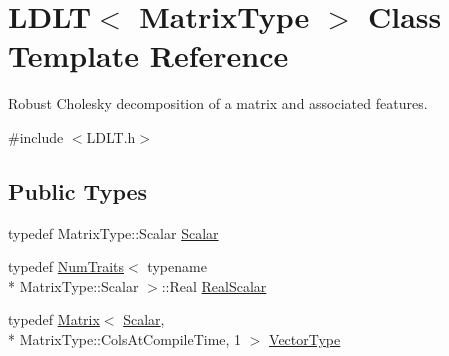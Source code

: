 \hypertarget{class_l_d_l_t}{\section{L\-D\-L\-T$<$ Matrix\-Type $>$ Class Template Reference}
\label{class_l_d_l_t}
}


Robust Cholesky decomposition of a matrix and associated features.  




{\ttfamily \#include $<$L\-D\-L\-T.\-h$>$}

\subsection*{Public Types}
\begin{DoxyCompactItemize}
\item 
typedef Matrix\-Type\-::\-Scalar \hyperlink{class_l_d_l_t_ae55ec2b52123617df554245d2abdd822}{Scalar}
\item 
typedef \hyperlink{struct_num_traits}{Num\-Traits}$<$ typename \\*
Matrix\-Type\-::\-Scalar $>$\-::Real \hyperlink{class_l_d_l_t_a5ef1952281688f7ff35aa4ec2ebc3bd8}{Real\-Scalar}
\item 
typedef \hyperlink{class_matrix}{Matrix}$<$ \hyperlink{class_l_d_l_t_ae55ec2b52123617df554245d2abdd822}{Scalar}, \\*
Matrix\-Type\-::\-Cols\-At\-Compile\-Time, 1 $>$ \hyperlink{class_l_d_l_t_a2a0f1aae9da955022bc638c215062cce}{Vector\-Type}
\end{DoxyCompactItemize}
